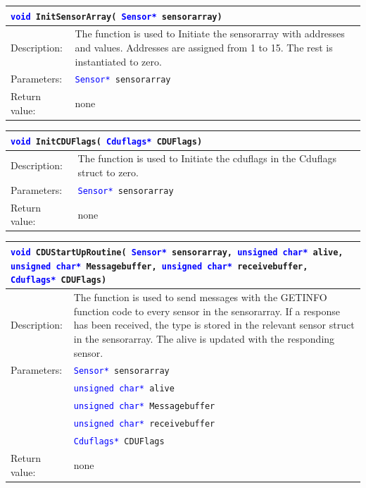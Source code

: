 \begin{table}[H]
\begin{tabular}{l p{12.5cm}}
\multicolumn{2}{l}{\texttt{\textcolor{blue}{void} InitSensorArray( \texttt{\textcolor{blue}{Sensor*} sensorarray})}} \\
\hline
Description:& The function is used to Initiate the sensorarray with addresses and values. Addresses are assigned from 1 to 15. The rest is instantiated to zero.\\
Parameters:&\texttt{\textcolor{blue}{Sensor*} sensorarray}\\
Return value:&none\\
\end{tabular}
\end{table}

\begin{table}[H]
\begin{tabular}{l p{12.5cm}}
\multicolumn{2}{l}{\texttt{\textcolor{blue}{void} InitCDUFlags( \texttt{\textcolor{blue}{Cduflags*} CDUFlags})}} \\
\hline
Description:& The function is used to Initiate the cduflags in the Cduflags struct to zero.\\
Parameters:&\texttt{\textcolor{blue}{Sensor*} sensorarray}\\
Return value:&none\\
\end{tabular}
\end{table}

\begin{table}[H]
\begin{tabular}{l p{12.5cm}}
\multicolumn{2}{p{15cm}}{\texttt{\textcolor{blue}{void} CDUStartUpRoutine( \texttt{\textcolor{blue}{Sensor*} sensorarray, \textcolor{blue}{unsigned char*} alive, \textcolor{blue}{unsigned char*} Messagebuffer, \textcolor{blue}{unsigned char*} receivebuffer, \textcolor{blue}{Cduflags*} CDUFlags})}} \\
\hline
Description:& The function is used to send messages with the GETINFO function code to every sensor in the sensorarray. If a response has been received, the type is stored in the relevant sensor struct in the sensorarray. The alive is updated with the responding sensor.\\
Parameters:&\texttt{\textcolor{blue}{Sensor*} sensorarray}\\
&\texttt{\textcolor{blue}{unsigned char*} alive}\\
&\texttt{\textcolor{blue}{unsigned char*} Messagebuffer}\\
&\texttt{\textcolor{blue}{unsigned char*} receivebuffer}\\
&\texttt{\textcolor{blue}{Cduflags*} CDUFlags}\\
Return value:&none\\
\end{tabular}
\end{table}

